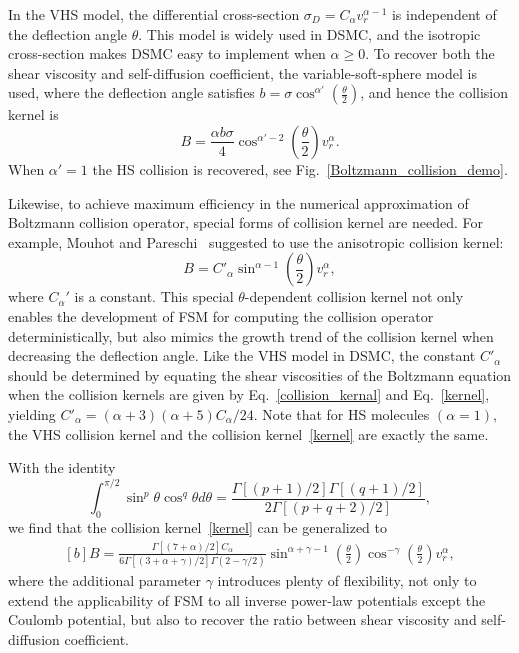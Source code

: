 In the VHS model, the differential cross-section $\sigma_D=C_\alpha{}v_r^{\alpha-1}$ is independent of the deflection angle $\theta$. This model is widely used in DSMC, and the isotropic cross-section makes DSMC easy to implement when $\alpha\ge0$. To recover both the shear viscosity and self-diffusion coefficient, the variable-soft-sphere model is used, where the deflection angle satisfies
$
b=\sigma\cos^{\alpha'}\left(\frac{\theta}{2}\right)$,
and hence the collision kernel is
\begin{equation}\label{vss}
B= \frac{\alpha{b\sigma}}{4}\cos^{\alpha'-2}\left(\frac{\theta}{2}\right)v_r^\alpha.
\end{equation}
When $\alpha'=1$ the HS collision is recovered, see Fig.~\ref{Boltzmann_collision_demo}.


Likewise, to achieve maximum efficiency in the numerical approximation of Boltzmann collision operator, special forms of collision kernel are needed. For example, Mouhot and Pareschi~\cite{Mouhot2006} suggested to use the anisotropic collision kernel:
\begin{equation}\label{kernel}
    B=C'_\alpha\sin^{\alpha-1}\left(\frac{\theta}{2}\right)v_r^\alpha,
\end{equation} 
where $C_\alpha'$ is a constant. This special $\theta$-dependent collision kernel not only enables the development of FSM for computing the collision operator deterministically, but also mimics the growth trend of the collision kernel when decreasing the deflection angle. Like the VHS model in DSMC, the constant $C'_\alpha$ should be determined by equating the shear viscosities of the Boltzmann equation when the collision kernels are given by Eq.~\eqref{collision_kernal} and Eq.~\eqref{kernel}, yielding $C'_\alpha={(\alpha+3)(\alpha+5)}C_\alpha/24$. Note that for HS molecules $(\alpha=1)$, the VHS collision kernel and the collision kernel~\eqref{kernel} are exactly the same.

With the identity $$\int_0^{\pi/2}\sin^p\theta\cos^q\theta{d\theta}=\frac{\Gamma[(p+1)/2]\Gamma[(q+1)/2]}{2\Gamma[(p+q+2)/2]},$$
we find that the collision kernel~\eqref{kernel} can be generalized to 
\begin{equation}\label{kernel_lei}
\begin{aligned}[b]
    B=\frac{\Gamma[(7+\alpha)/2]C_\alpha}{6\Gamma[(3+\alpha+\gamma)/2]\Gamma(2-\gamma/2)}\sin^{\alpha+\gamma-1}\left(\frac{\theta}{2}\right)
    \cos^{-\gamma}\left(\frac{\theta}{2}\right)v_r^\alpha,
    \end{aligned}
\end{equation}
where the additional parameter $\gamma$ introduces plenty of flexibility, not only to extend the applicability of FSM to all inverse power-law potentials except the Coulomb potential, but also to recover the ratio between shear viscosity and self-diffusion coefficient. %


